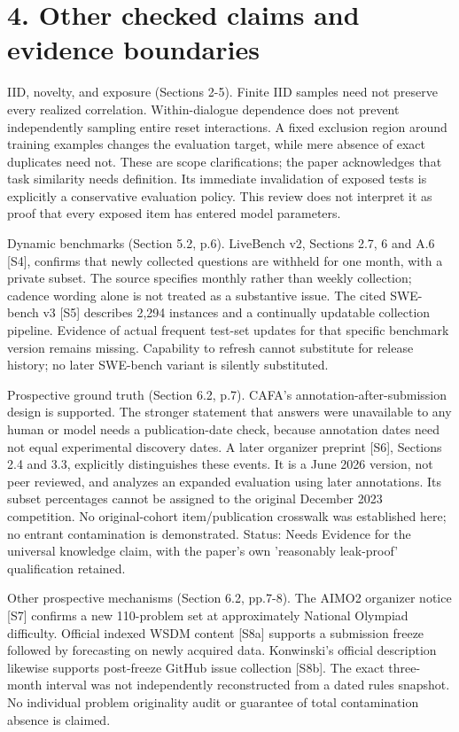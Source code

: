 \documentclass[10pt]{article}
\begin{document}
\section*{4. Other checked claims and evidence boundaries}
IID, novelty, and exposure (Sections 2-5). Finite IID samples need not preserve every realized correlation. Within-dialogue dependence does not prevent independently sampling entire reset interactions. A fixed exclusion region around training examples changes the evaluation target, while mere absence of exact duplicates need not. These are scope clarifications; the paper acknowledges that task similarity needs definition. Its immediate invalidation of exposed tests is explicitly a conservative evaluation policy. This review does not interpret it as proof that every exposed item has entered model parameters.\par
Dynamic benchmarks (Section 5.2, p.6). LiveBench v2, Sections 2.7, 6 and A.6 [S4], confirms that newly collected questions are withheld for one month, with a private subset. The source specifies monthly rather than weekly collection; cadence wording alone is not treated as a substantive issue. The cited SWE-bench v3 [S5] describes 2,294 instances and a continually updatable collection pipeline. Evidence of actual frequent test-set updates for that specific benchmark version remains missing. Capability to refresh cannot substitute for release history; no later SWE-bench variant is silently substituted.\par
Prospective ground truth (Section 6.2, p.7). CAFA’s annotation-after-submission design is supported. The stronger statement that answers were unavailable to any human or model needs a publication-date check, because annotation dates need not equal experimental discovery dates. A later organizer preprint [S6], Sections 2.4 and 3.3, explicitly distinguishes these events. It is a June 2026 version, not peer reviewed, and analyzes an expanded evaluation using later annotations. Its subset percentages cannot be assigned to the original December 2023 competition. No original-cohort item/publication crosswalk was established here; no entrant contamination is demonstrated. Status: Needs Evidence for the universal knowledge claim, with the paper’s own ’reasonably leak-proof’ qualification retained.\par
Other prospective mechanisms (Section 6.2, pp.7-8). The AIMO2 organizer notice [S7] confirms a new 110-problem set at approximately National Olympiad difficulty. Official indexed WSDM content [S8a] supports a submission freeze followed by forecasting on newly acquired data. Konwinski’s official description likewise supports post-freeze GitHub issue collection [S8b]. The exact three-month interval was not independently reconstructed from a dated rules snapshot. No individual problem originality audit or guarantee of total contamination absence is claimed.\par
\end{document}

